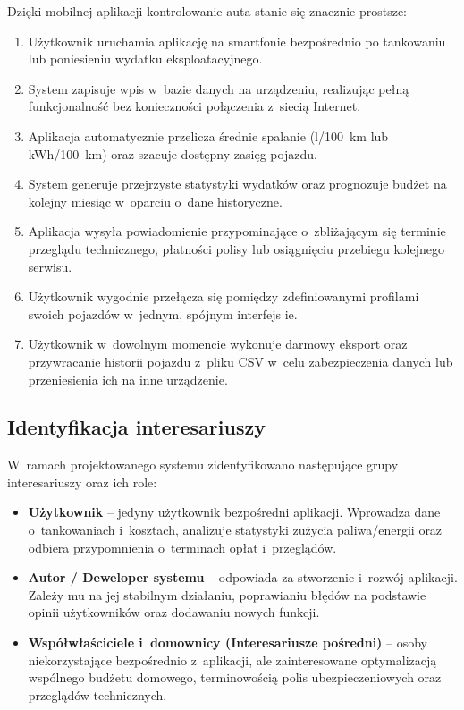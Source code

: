 Dzięki mobilnej aplikacji kontrolowanie auta stanie się znacznie prostsze:
\begin{enumerate}
    \item Użytkownik uruchamia aplikację na smartfonie bezpośrednio po tankowaniu lub poniesieniu wydatku eksploatacyjnego.
    \item System zapisuje wpis w~bazie danych na urządzeniu, realizując pełną funkcjonalność bez konieczności połączenia z~siecią Internet.
    \item Aplikacja automatycznie przelicza średnie spalanie (l/100~km lub kWh/100~km) oraz szacuje dostępny zasięg pojazdu.
    \item System generuje przejrzyste statystyki wydatków oraz prognozuje budżet na kolejny miesiąc w~oparciu o~dane historyczne.
    \item Aplikacja wysyła powiadomienie przypominające o~zbliżającym się terminie przeglądu technicznego, płatności polisy lub osiągnięciu przebiegu kolejnego serwisu.
    \item Użytkownik wygodnie przełącza się pomiędzy zdefiniowanymi profilami swoich pojazdów w~jednym, spójnym interfejs    ie.
    \item Użytkownik w~dowolnym momencie wykonuje darmowy eksport oraz przywracanie historii pojazdu z~pliku CSV w~celu zabezpieczenia danych lub przeniesienia ich na inne urządzenie.
\end{enumerate}


\subsection{Identyfikacja interesariuszy}
\label{subsec:interesariusze}

W~ramach projektowanego systemu zidentyfikowano następujące grupy interesariuszy oraz ich role:
\begin{itemize}
    \item \textbf{Użytkownik} -- jedyny użytkownik bezpośredni aplikacji. Wprowadza dane o~tankowaniach i~kosztach, analizuje statystyki zużycia paliwa/energii oraz odbiera przypomnienia o~terminach opłat i~przeglądów.
    \item \textbf{Autor / Deweloper systemu} -- odpowiada za stworzenie i~rozwój aplikacji. Zależy mu na jej stabilnym działaniu, poprawianiu błędów na podstawie opinii użytkowników oraz dodawaniu nowych funkcji.
    \item \textbf{Współwłaściciele i~domownicy (Interesariusze pośredni)} -- osoby niekorzystające bezpośrednio z~aplikacji, ale zainteresowane optymalizacją wspólnego budżetu domowego, terminowością polis ubezpieczeniowych oraz przeglądów technicznych.
\end{itemize}


